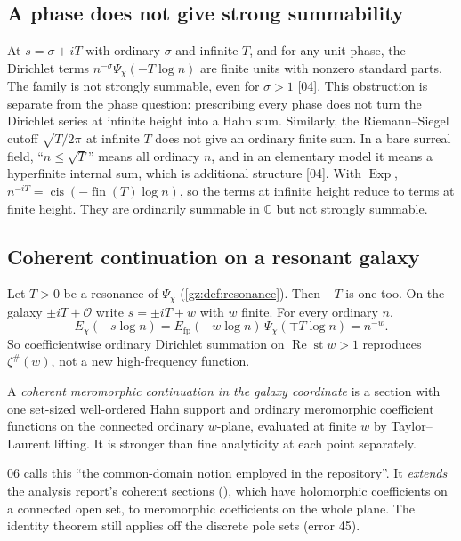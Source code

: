 \documentclass[11pt,a4paper]{article}
\numberwithin{equation}{section}
\theoremstyle{definition}
\theoremstyle{remark}
\newcommand{\C}{\mathbb C}
\newcommand{\OO}{\mathcal O}
\renewcommand{\Re}{\operatorname{Re}}
\newcommand{\st}{\operatorname{st}}
\newcommand{\fin}{\operatorname{fin}}
\newcommand{\cis}{\operatorname{cis}}
\newcommand{\Exp}{\operatorname{Exp}}
\newcommand{\Efp}{E_{\mathrm{fp}}}
\newcommand{\zp}{\zeta^{\#}}
\newcommand{\src}[1]{\textup{[#1]}}
\begin{document}
\subsection{A phase does not give strong summability}
At $s=\sigma+iT$ with ordinary $\sigma$ and infinite $T$, and for any unit
phase, the Dirichlet terms $n^{-\sigma}\Psi_\chi(-T\log n)$ are finite units
with nonzero standard parts. The family is not strongly summable, even for
$\sigma>1$ \src{04}. This obstruction is separate from the phase question:
prescribing every phase does not turn the Dirichlet series at infinite
height into a Hahn sum. Similarly, the Riemann--Siegel cutoff
$\sqrt{T/2\pi}$ at infinite $T$ does not give an ordinary finite sum. In a
bare surreal field, ``$n\le\sqrt T$'' means all ordinary $n$, and in an
elementary model it means a hyperfinite internal sum, which is additional
structure \src{04}. With $\Exp$, $n^{-iT}=\cis(-\fin(T)\log n)$, so the terms
at infinite height reduce to terms at finite height. They are ordinarily
summable in $\C$ but not strongly summable.

\subsection{Coherent continuation on a resonant galaxy}
Let $T>0$ be a resonance of $\Psi_\chi$ (\cref{gz:def:resonance}). Then $-T$ is
one too. On the galaxy $\pm iT+\OO$ write $s=\pm iT+w$ with $w$ finite. For
every ordinary $n$,
\begin{equation}\label{gz:eq:resonantpowers}
E_\chi(-s\log n)=\Efp(-w\log n)\,\Psi_\chi(\mp T\log n)=n^{-w}.
\end{equation}
So coefficientwise ordinary Dirichlet summation on $\Re\st w>1$ reproduces
$\zp(w)$, not a new high-frequency function.

\begin{definition}[Coherent meromorphic continuation \src{06}]\label{gz:def:coherent}
A \emph{coherent meromorphic continuation in the galaxy coordinate} is a
section with one set-sized well-ordered Hahn support and ordinary
meromorphic coefficient functions on the connected ordinary $w$-plane,
evaluated at finite $w$ by Taylor--Laurent lifting. It is stronger than
fine analyticity at each point separately.
\end{definition}
06 calls this ``the common-domain notion employed in the repository''. It
\emph{extends} the analysis report's coherent sections (),
which have holomorphic coefficients on a connected open set, to meromorphic
coefficients on the whole plane. The identity theorem still applies off the
discrete pole sets (error 45).
\end{document}
